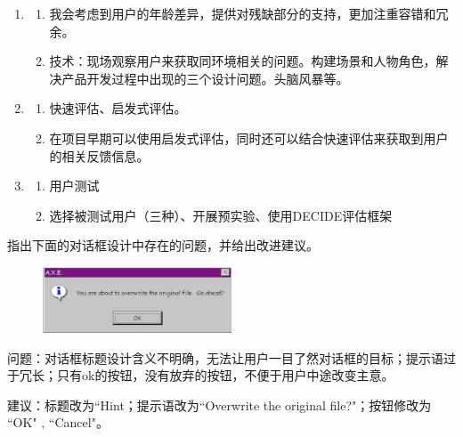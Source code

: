 \begin{solution}
\begin{enumerate}[label=\arabic*.]
    \item 
    \begin{enumerate}[label=(\arabic*)]
        \item 我会考虑到用户的年龄差异，提供对残缺部分的支持，更加注重容错和冗余。
        \item 技术：现场观察用户来获取同环境相关的问题。构建场景和人物角色，解决产品开发过程中出现的三个设计问题。头脑风暴等。
    \end{enumerate}
    \item 
    \begin{enumerate}[label=(\arabic*)]
        \item 快速评估、启发式评估。
        \item 在项目早期可以使用启发式评估，同时还可以结合快速评估来获取到用户的相关反馈信息。
    \end{enumerate}
    \item 
    \begin{enumerate}[label=(\arabic*)]
        \item 用户测试
        \item 选择被测试用户（三种）、开展预实验、使用DECIDE评估框架
    \end{enumerate}
\end{enumerate}
\end{solution}



\begin{problem}[2013、2022]
指出下面的对话框设计中存在的问题，并给出改进建议。
\begin{figure}[H]
    \vspace{-0.5em}
	\centering
	\includegraphics[width=0.5\textwidth]{20221.png}
    \vspace{-1em}
\end{figure}
\end{problem}

\begin{solution}
问题：对话框标题设计含义不明确，无法让用户一目了然对话框的目标；提示语过于冗长；只有ok的按钮，没有放弃的按钮，不便于用户中途改变主意。

建议：标题改为``Hint；提示语改为``Overwrite the original file?"；按钮修改为 ``OK" , ``Cancel"。
\end{solution}




